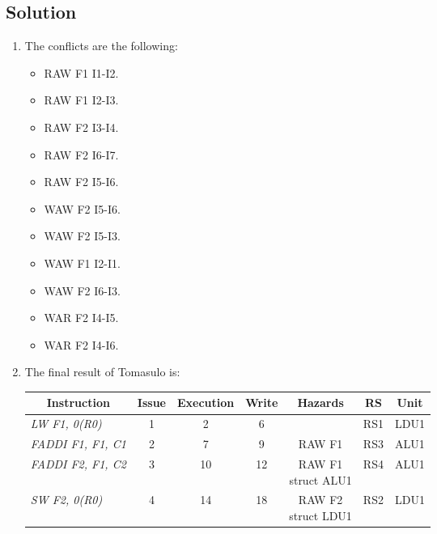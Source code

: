 \subsection*{Solution}
\begin{enumerate}
    \item The conflicts are the following: 
        \begin{itemize}
            \item RAW F1 I1-I2.
            \item RAW F1 I2-I3.
            \item RAW F2 I3-I4.
            \item RAW F2 I6-I7.
            \item RAW F2 I5-I6.
            \item WAW F2 I5-I6.
            \item WAW F2 I5-I3.
            \item WAW F1 I2-I1.
            \item WAW F2 I6-I3.
            \item WAR F2 I4-I5.
            \item WAR F2 I4-I6.
        \end{itemize}
    \item The final result of Tomasulo is: 
            \begin{table}[H]
                \centering
                \begin{tabular}{l|ccc|ccc}
                \multicolumn{1}{c|}{\textbf{Instruction}} & \textbf{Issue} & \textbf{Execution} & \textbf{Write} & \textbf{Hazards}                               & \textbf{RS} & \textbf{Unit} \\ \hline
                \textit{LW F1, 0(R0)}                     & 1              & 2                  & 6              &                                                & RS1         & LDU1          \\
                \textit{FADDI F1, F1, C1}                 & 2              & 7                  & 9              & RAW F1                                         & RS3         & ALU1          \\
                \textit{FADDI F2, F1, C2}                 & 3              & 10                 & 12             & \makecell{RAW F1 \\ struct ALU1}               & RS4         & ALU1          \\
                \textit{SW F2, 0(R0)}                     & 4              & 14                 & 18             & \makecell{RAW F2 \\ struct LDU1}               & RS2         & LDU1          \\

\end{tabular}
\end{table}
\end{enumerate}
